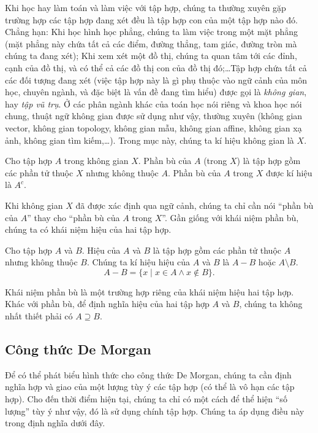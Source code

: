 Khi học hay làm toán và làm việc với tập hợp, chúng ta thường xuyên gặp trường hợp các tập hợp đang xét đều là tập hợp con của một tập hợp nào đó. Chẳng hạn: Khi học hình học phẳng, chúng ta làm việc trong một mặt phẳng (mặt phẳng này chứa tất cả các điểm, đường thẳng, tam giác, đường tròn mà chúng ta đang xét); Khi xem xét một đồ thị, chúng ta quan tâm tới các đỉnh, cạnh của đồ thị, và có thể cả các đồ thị con của đồ thị đó;\ldots Tập hợp chứa tất cả các đối tượng đang xét (việc tập hợp này là gì phụ thuộc vào ngữ cảnh của môn học, chuyên ngành, và đặc biệt là vấn đề đang tìm hiểu) được gọi là \textit{không gian}, hay \textit{tập vũ trụ}. Ở các phân ngành khác của toán học nói riêng và khoa học nói chung, thuật ngữ không gian được sử dụng như vậy, thường xuyên (không gian vector, không gian topology, không gian mẫu, không gian affine, không gian xạ ảnh, không gian tìm kiếm,\ldots). Trong mục này, chúng ta kí hiệu không gian là $X$.

\begin{definition}[Phần bù]
    Cho tập hợp $A$ trong không gian $X$. Phần bù của $A$ (trong $X$) là tập hợp gồm các phần tử thuộc $X$ nhưng không thuộc $A$. Phần bù của $A$ trong $X$ được kí hiệu là $A^{c}$.
\end{definition}

Khi không gian $X$ đã được xác định qua ngữ cảnh, chúng ta chỉ cần nói ``phần bù của $A$'' thay cho ``phần bù của $A$ trong $X$''. Gần giống với khái niệm phần bù, chúng ta có khái niệm hiệu của hai tập hợp.

\begin{definition}
    Cho tập hợp $A$ và $B$. Hiệu của $A$ và $B$ là tập hợp gồm các phần tử thuộc $A$ nhưng không thuộc $B$. Chúng ta kí hiệu hiệu của $A$ và $B$ là $A - B$ hoặc $A\setminus B$.
    \[
        A - B = \{ x \mid x\in A \wedge x\notin B \}.
    \]
\end{definition}

Khái niệm phần bù là một trường hợp riêng của khái niệm hiệu hai tập hợp. Khác với phần bù, để định nghĩa hiệu của hai tập hợp $A$ và $B$, chúng ta không nhất thiết phải có $A\supseteq B$.

\subsection*{Công thức De Morgan}

Để có thể phát biểu hình thức cho công thức De Morgan, chúng ta cần định nghĩa hợp và giao của một lượng tùy ý các tập hợp (có thể là vô hạn các tập hợp). Cho đến thời điểm hiện tại, chúng ta chỉ có một cách để thể hiện ``số lượng'' tùy ý như vậy, đó là sử dụng chính tập hợp. Chúng ta áp dụng điều này trong định nghĩa dưới đây.

